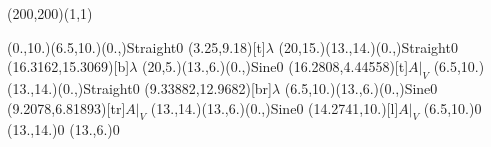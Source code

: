 \unitlength=1bp%

\begin{feynartspicture}(200,200)(1,1)

\FADiagram{}
\FAProp(0.,10.)(6.5,10.)(0.,){Straight}{0}
\FALabel(3.25,9.18)[t]{$\lambda$}
\FAProp(20,15.)(13.,14.)(0.,){Straight}{0}
\FALabel(16.3162,15.3069)[b]{$\lambda$}
\FAProp(20,5.)(13.,6.)(0.,){Sine}{0}
\FALabel(16.2808,4.44558)[t]{$A|_V$}
\FAProp(6.5,10.)(13.,14.)(0.,){Straight}{0}
\FALabel(9.33882,12.9682)[br]{$\lambda$}
\FAProp(6.5,10.)(13.,6.)(0.,){Sine}{0}
\FALabel(9.2078,6.81893)[tr]{$A|_V$}
\FAProp(13.,14.)(13.,6.)(0.,){Sine}{0}
\FALabel(14.2741,10.)[l]{$A|_V$}
\FAVert(6.5,10.){0}
\FAVert(13.,14.){0}
\FAVert(13.,6.){0}
\end{feynartspicture}

